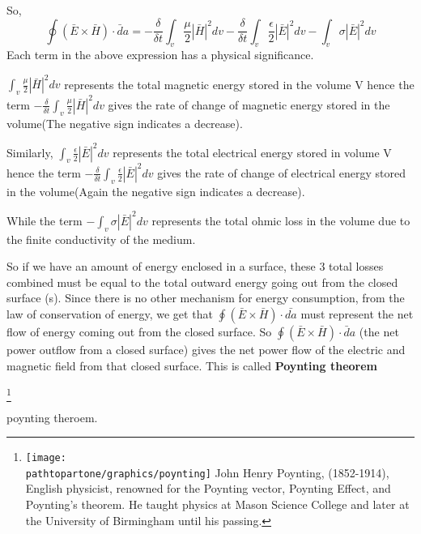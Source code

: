 So,
\begin{dmath}
\oint(\bar{E}\times\bar{H})\cdot\bar{d}a = -  \frac{\delta}{\delta t}\int_{v} \frac{\mu}{2}|\bar{H}|^{2}dv -  \frac{\delta}{\delta t}\int_{v}\frac{\epsilon}{2}|\bar{E}|^{2}dv
- \int_{v}\sigma|\bar{E}|^{2}dv 
\end{dmath}
Each term in the above expression has a physical significance.

$\int_{v} \frac{\mu}{2}|\bar{H}|^{2}dv$ represents the total magnetic energy stored in the volume V hence the term $-\frac{\delta}{\delta t}\int_{v} \frac{\mu}{2}|\bar{H}|^{2}dv$ gives the rate of change of magnetic energy stored in the volume(The negative sign indicates a decrease).

Similarly, $\int_{v}\frac{\epsilon}{2}|\bar{E}|^{2}dv$ represents the total electrical energy stored in volume V hence the term $-\frac{\delta}{\delta t}\int_{v}\frac{\epsilon}{2}|\bar{E}|^{2}dv$ gives the rate of change of electrical energy stored in the volume(Again the negative sign indicates a decrease).

While the term $-\int_{v}\sigma|\bar{E}|^{2}dv $ represents the total ohmic loss in the volume due to the finite conductivity of the medium.

So if we have an amount of energy enclosed in a surface, these 3 total losses combined must be equal to the total outward energy going out from the closed surface (s). Since there is no other mechanism for energy consumption, from the law of conservation of energy, we get that $ \oint(\bar{E}\times\bar{H})\cdot\bar{da} $ must represent the net flow of energy coming out from the closed surface. So $ \oint(\bar{E}\times\bar{H})\cdot\bar{d}a $ (the net power outflow from a closed surface)  gives the net power flow of the electric and magnetic field from that closed surface. This is called \textbf{Poynting theorem}

\footnote{
\texttt{[image: \\pathtopartone/graphics/poynting]}
John Henry Poynting, (1852-1914), English physicist, renowned for the Poynting vector, Poynting Effect, and Poynting's theorem. He taught physics at Mason Science College and later at the University of Birmingham until his passing.
}

poynting theroem. 
